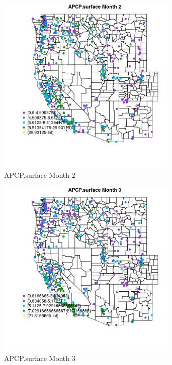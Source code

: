 \clearpage 

\begin{figure} 
\centering  
\includegraphics[width=0.77\textwidth]{Code_Outputs/ML_input_report_ML_input_PM25_Step5_part_d_de_duplicated_aves_ML_input_MapObsMo2APCPsurface.jpg} 
\caption{\label{fig:ML_input_report_ML_input_PM25_Step5_part_d_de_duplicated_aves_ML_inputMapObsMo2APCPsurface}APCP.surface Month 2} 
\end{figure} 
 

\begin{figure} 
\centering  
\includegraphics[width=0.77\textwidth]{Code_Outputs/ML_input_report_ML_input_PM25_Step5_part_d_de_duplicated_aves_ML_input_MapObsMo3APCPsurface.jpg} 
\caption{\label{fig:ML_input_report_ML_input_PM25_Step5_part_d_de_duplicated_aves_ML_inputMapObsMo3APCPsurface}APCP.surface Month 3} 
\end{figure} 
 

